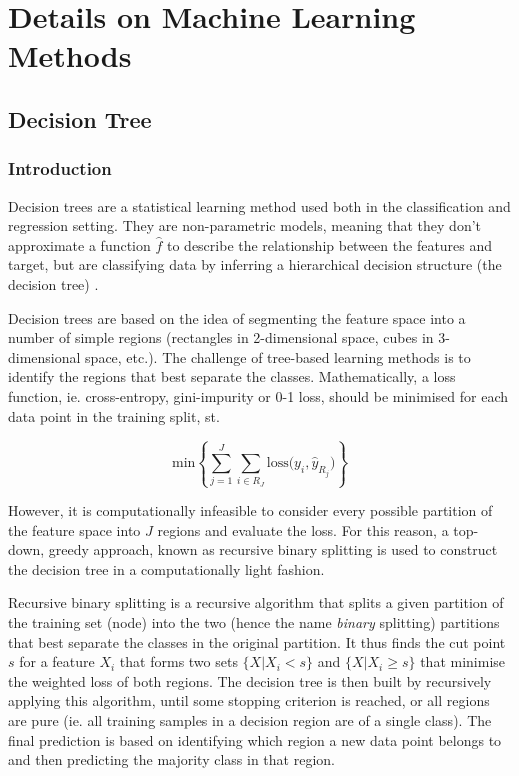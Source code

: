 \section{Details on Machine Learning Methods}
\subsection{Decision Tree}
\subsubsection{Introduction}
Decision trees are a statistical learning method used both in the classification and regression setting. They are non-parametric models, meaning that they don't approximate a function $\hat{f}$ to describe the relationship between the features and target, but are classifying data by inferring a hierarchical decision structure (the decision tree) \cite{introStats}.

Decision trees are based on the idea of segmenting the feature space into a number of simple regions (rectangles in 2-dimensional space, cubes in 3-dimensional space, etc.). The challenge of tree-based learning methods is to identify the regions that best separate the classes. Mathematically, a loss function, ie. cross-entropy, gini-impurity or 0-1 loss, should be minimised for each data point in the training split, st.

$$
\text{min}\left\{\sum_{j=1}^J\sum_{i\in{R_J}} \text{loss(}y_i, \hat{y}_{R_j}\text{)}\right\}
$$
\vspace{5pt}

However, it is computationally infeasible to consider every possible partition of the feature space into $J$ regions and evaluate the loss. For this reason, a top-down, greedy approach, known as recursive binary splitting is used to construct the decision tree in a computationally light fashion.

Recursive binary splitting is a recursive algorithm that splits a given partition of the training set (node) into the two (hence the name \textit{binary} splitting) partitions that best separate the classes in the original partition. It thus finds the cut point $s$ for a feature $X_i$ that forms two sets $\{X| X_i<s\}$ and $\{X|X_i\ge s\}$ that minimise the weighted loss of both regions. 
The decision tree is then built by recursively applying this algorithm, until some stopping criterion is reached, or all regions are pure (ie. all training samples in a decision region are of a single class). The final prediction is based on identifying which region a new data point belongs to and then predicting the majority class in that region. 

